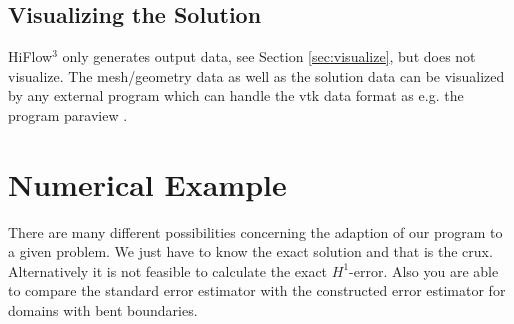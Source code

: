 \documentclass[a4paper, 11pt, twoside]{article}
\begin{document}
\subsection{Visualizing the Solution}
HiFlow$^3$ only generates output data, see Section \ref{sec:visualize}, but does not visualize. The mesh/geometry data as well as the solution data can be visualized 
by any external program which can handle the vtk data format as e.g. the program paraview \cite{Paraview}. 

\section{Numerical Example}\label{sectionExample}
There are many different possibilities concerning the adaption of our program to a given problem. We just have to know the exact solution and that is the crux.
Alternatively it is not feasible to calculate the exact $H^1$-error. Also you are able to compare the standard error estimator
with the constructed error estimator for domains with bent boundaries.
\end{document}
